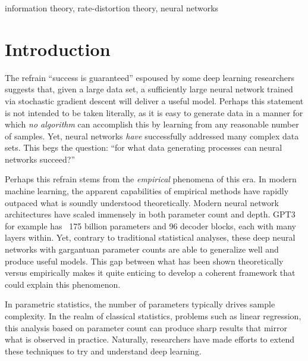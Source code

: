 \documentclass[twoside,11pt]{article}
\newcommand{\kibitz}[2]{\ifnum\Comments=1{\textcolor{#1}{\textsf{\footnotesize #2}}}\fi}
\newcommand{\ben}[1]{\kibitz{darkred}{[BVR: #1]}}
\begin{document}
\begin{keywords}
information theory, rate-distortion theory, neural networks
\end{keywords}

\section{Introduction}

The refrain ``success is guaranteed'' espoused by some deep learning researchers suggests that, given a large data set, a sufficiently large neural network trained via stochastic gradient descent will deliver a useful model.  Perhaps this statement is not intended to be taken literally, as it is easy to generate data in a manner for which {\it no algorithm} can accomplish this by learning from any reasonable number of samples.  Yet, neural networks {\it have} successfully addressed many complex data sets.  This begs the question: ``for what data generating processes can neural networks succeed?''

Perhaps this refrain stems from the \emph{empirical} phenomena of this era. In modern machine learning, the apparent capabilities of empirical methods have rapidly outpaced what is soundly understood theoretically. Modern neural network architectures have scaled immensely in both parameter count and depth. GPT3 for example has ~175 billion parameters and 96 decoder blocks, each with many layers within. Yet, contrary to traditional statistical analyses, these deep neural networks with gargantuan parameter counts are able to generalize well and produce useful models. This gap between what has been shown theoretically versus empirically makes it quite enticing to develop a coherent framework that could explain this phenomenon.

In parametric statistics, the number of parameters typically drives sample complexity. In the realm of classical statistics, problems such as linear regression, this analysis based on parameter count can produce sharp results that mirror what is observed in practice. Naturally, researchers have made efforts to extend these techniques to try and understand deep learning.
\end{document}
